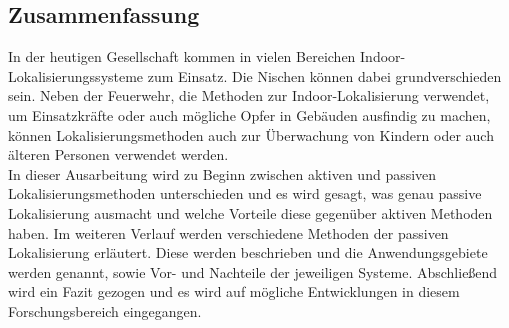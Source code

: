 \subsection*{Zusammenfassung}
\pagestyle{empty}
In der heutigen Gesellschaft kommen in vielen Bereichen Indoor-Lokalisierungssysteme zum Einsatz. Die Nischen können dabei grundverschieden sein. Neben der Feuerwehr, die Methoden zur Indoor-Lokalisierung verwendet, um Einsatzkräfte oder auch mögliche Opfer in Gebäuden ausfindig zu machen, können Lokalisierungsmethoden auch zur Überwachung von Kindern oder auch älteren Personen verwendet werden.\\
In dieser Ausarbeitung wird zu Beginn zwischen aktiven und passiven Lokalisierungsmethoden unterschieden und es wird gesagt, was genau passive Lokalisierung ausmacht und welche Vorteile diese gegenüber aktiven Methoden haben. Im weiteren Verlauf werden verschiedene Methoden der passiven Lokalisierung erläutert. Diese werden beschrieben und die Anwendungsgebiete werden genannt, sowie Vor- und Nachteile der jeweiligen Systeme. Abschließend wird ein Fazit gezogen und es wird auf mögliche Entwicklungen in diesem Forschungsbereich eingegangen. 